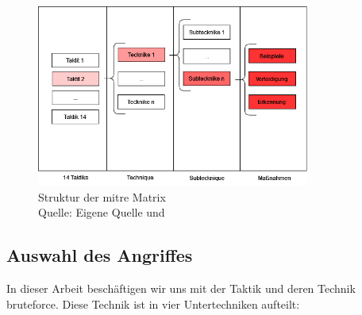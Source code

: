 \begin{figure}[H]
   \centering
   \includegraphics[width=0.8\textwidth]{assets/Mitre_structure.drawio.png}
   \caption[Struktur der \gls{mitre} Matrix]
   {Struktur der \gls{mitre} Matrix \\Quelle: Eigene Quelle und \citep{Mitre_Started}}
   \label{fig:ttp}
   \centering
\end{figure}


\newpage
\subsection{Auswahl des Angriffes}
In dieser Arbeit beschäftigen wir uns mit der Taktik  und deren Technik \gls{bruteforce}. Diese Technik ist in vier Untertechniken aufteilt:

